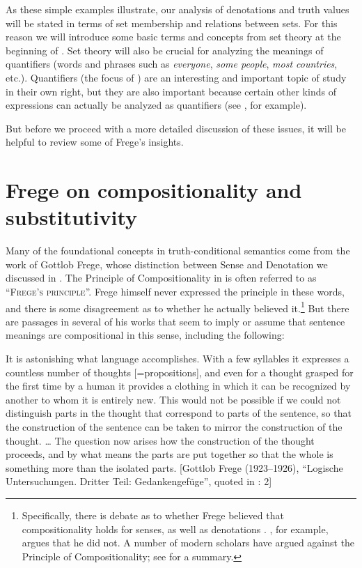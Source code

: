 As these simple examples illustrate, our analysis of denotations and truth values will be stated in terms of set membership and relations between sets. For this reason we will introduce some basic terms and concepts from set theory at the beginning of . Set theory will also be crucial for analyzing the meanings of quantifiers (words and phrases such as \textit{everyone}, \textit{some people}, \textit{most countries}, etc.). Quantifiers (the focus of ) are an interesting and important topic of study in their own right, but they are also important because certain other kinds of expressions can actually be analyzed as quantifiers (see , for example).



But before we proceed with a more detailed discussion of these issues, it will be helpful to review some of Frege’s insights.


\section{Frege on compositionality and substitutivity}\label{sec:12.3}

Many of the foundational concepts in truth-conditional semantics come from the work of Gottlob Frege, whose distinction between Sense and Denotation we discussed in . The Principle of Compositionality in  is often referred to as “\textsc{Frege’s principle}”. Frege himself never expressed the principle in these words, and there is some disagreement as to whether he actually believed it.\footnote{Specifically, there is debate as to whether Frege believed that compositionality holds for senses, as well as denotations \citep[12]{Gamut1991b}. \citet{Pelletier2001}, for example, argues that he did not. A number of modern scholars have argued against the Principle of Compositionality; see \citet{Goldberg2015} for a summary.} But there are passages in several of his works that seem to imply or assume that sentence meanings are compositional in this sense, including the following:


It is astonishing what language accomplishes. With a few syllables it expresses a countless number of thoughts [=propositions], and even for a thought grasped for the first time by a human it provides a clothing in which it can be recognized by another to whom it is entirely new. This would not be possible if we could not distinguish parts in the thought that correspond to parts of the sentence, so that the construction of the sentence can be taken to mirror the construction of the thought. … The question now arises how the construction of the thought proceeds, and by what means the parts are put together so that the whole is something more than the isolated parts.   [Gottlob Frege (1923–1926), “Logische Untersuchungen. Dritter Teil: Gedankengefüge”, quoted in \citealt{HeimKratzer1998}: 2]


